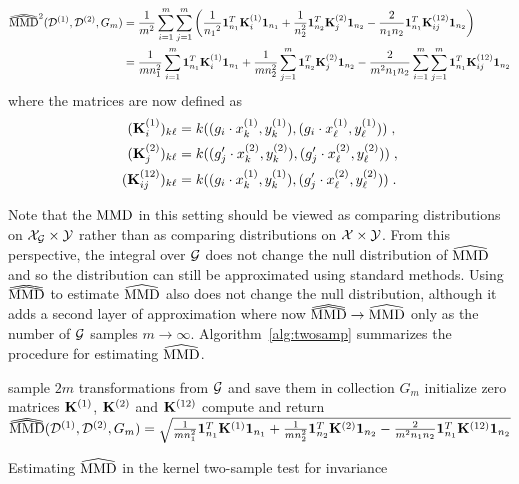 \begin{align*}
\dhatMMD^2(\calD^{(1)},\calD^{(2)},G_m) &= \frac{1}{m^2}\sum_{i=1}^m\sum_{j=1}^m \left(\frac{1}{{n_1}^2}\onevec_{n_1}^T\bfK_i^{(1)}\onevec_{n_1} + \frac{1}{n_2^2}\onevec_{n_2}^T\bfK_j^{(2)}\onevec_{n_2} - \frac{2}{n_1n_2}\onevec_{n_1}^T\bfK_{ij}^{(12)}\onevec_{n_2}\right) \\
&= \frac{1}{mn_1^2}\sum_{i=1}^m\onevec_{n_1}^T\bfK_i^{(1)}\onevec_{n_1} + \frac{1}{mn_2^2}\sum_{j=1}^m\onevec_{n_2}^T\bfK_j^{(2)}\onevec_{n_2} - \frac{2}{m^2n_1n_2}\sum_{i=1}^m\sum_{j=1}^m\onevec_{n_1}^T\bfK_{ij}^{(12)}\onevec_{n_2}
\end{align*}
where the matrices are now defined as
\begin{align*}
(\mathbf{K}_i^{(1)})_{k\ell} &= k((g_i\cdot x^{(1)}_k,y^{(1)}_k),(g_i\cdot x^{(1)}_\ell,y^{(1)}_\ell)) \;, \\
(\mathbf{K}_j^{(2)})_{k\ell} &= k((g_j'\cdot x^{(2)}_k, y^{(2)}_k),(g_j'\cdot x^{(2)}_\ell, y^{(2)}_\ell)) \;, \\
(\mathbf{K}_{ij}^{(12)})_{k\ell} &= k((g_i\cdot x^{(1)}_k, y^{(1)}_k),(g_j'\cdot x^{(2)}_\ell, y^{(2)}_\ell)) \;. 
\end{align*}

Note that the $\mathrm{MMD}$ in this setting should be viewed as comparing distributions on $\mathcal{X}_{\mathcal{G}}\times\mathcal{Y}$ rather than as comparing distributions on $\mathcal{X}\times\mathcal{Y}$. From this perspective, the integral over $\mathcal{G}$ does not change the null distribution of $\widehat{\mathrm{MMD}}$ and so the distribution can still be approximated using standard methods. Using $\dhatMMD$ to estimate $\widehat{\mathrm{MMD}}$ also does not change the null distribution, although it adds a second layer of approximation where now $\dhatMMD\rightarrow\hatMMD$ only as the number of $\mathcal{G}$ samples $m\rightarrow\infty$. Algorithm~\ref{alg:twosamp} summarizes the procedure for estimating $\widehat{\mathrm{MMD}}$.
\\

\begin{algorithm}[H]
\SetAlgoLined
{}
\BlankLine
sample $2m$ transformations from $\mathcal{G}$ and save them in collection $G_m$\;
initialize zero matrices $\mathbf{K}^{(1)}$, $\mathbf{K}^{(2)}$ and $\mathbf{K}^{(12)}$\;
compute and return $\dhatMMD(\calD^{(1)},\calD^{(2)}, G_m)=\sqrt{\frac{1}{mn_1^2}\onevec_{n_1}^T\bfK^{(1)}\onevec_{n_1} + \frac{1}{mn_2^2}\onevec_{n_2}^T\bfK^{(2)}\onevec_{n_2} - \frac{2}{m^2n_1n_2}\onevec_{n_1}^T\bfK^{(12)}\onevec_{n_2}}$\;
\caption{Estimating $\widehat{\mathrm{MMD}}$ in the kernel two-sample test for invariance}
\label{alg:twosamp}
\end{algorithm}
\vspace{1em}

